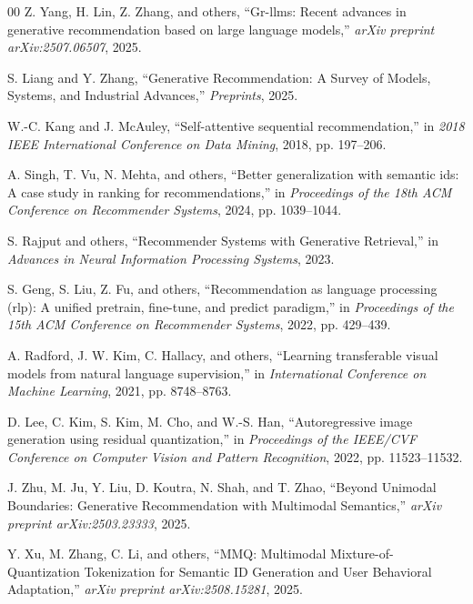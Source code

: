 \documentclass[conference]{IEEEtran}
\begin{document}
\begin{thebibliography}{00}
Z. Yang, H. Lin, Z. Zhang, and others, ``Gr-llms: Recent advances in generative recommendation based on large language models,'' \emph{arXiv preprint arXiv:2507.06507}, 2025.

S. Liang and Y. Zhang, ``Generative Recommendation: A Survey of Models, Systems, and Industrial Advances,'' \emph{Preprints}, 2025.

W.-C. Kang and J. McAuley, ``Self-attentive sequential recommendation,'' in \emph{2018 IEEE International Conference on Data Mining}, 2018, pp. 197--206.

A. Singh, T. Vu, N. Mehta, and others, ``Better generalization with semantic ids: A case study in ranking for recommendations,'' in \emph{Proceedings of the 18th ACM Conference on Recommender Systems}, 2024, pp. 1039--1044.

S. Rajput and others, ``Recommender Systems with Generative Retrieval,'' in \emph{Advances in Neural Information Processing Systems}, 2023.

S. Geng, S. Liu, Z. Fu, and others, ``Recommendation as language processing (rlp): A unified pretrain, fine-tune, and predict paradigm,'' in \emph{Proceedings of the 15th ACM Conference on Recommender Systems}, 2022, pp. 429--439.

A. Radford, J. W. Kim, C. Hallacy, and others, ``Learning transferable visual models from natural language supervision,'' in \emph{International Conference on Machine Learning}, 2021, pp. 8748--8763.

D. Lee, C. Kim, S. Kim, M. Cho, and W.-S. Han, ``Autoregressive image generation using residual quantization,'' in \emph{Proceedings of the IEEE/CVF Conference on Computer Vision and Pattern Recognition}, 2022, pp. 11523--11532.

J. Zhu, M. Ju, Y. Liu, D. Koutra, N. Shah, and T. Zhao, ``Beyond Unimodal Boundaries: Generative Recommendation with Multimodal Semantics,'' \emph{arXiv preprint arXiv:2503.23333}, 2025.

Y. Xu, M. Zhang, C. Li, and others, ``MMQ: Multimodal Mixture-of-Quantization Tokenization for Semantic ID Generation and User Behavioral Adaptation,'' \emph{arXiv preprint arXiv:2508.15281}, 2025.


\end{thebibliography}
\end{document}
